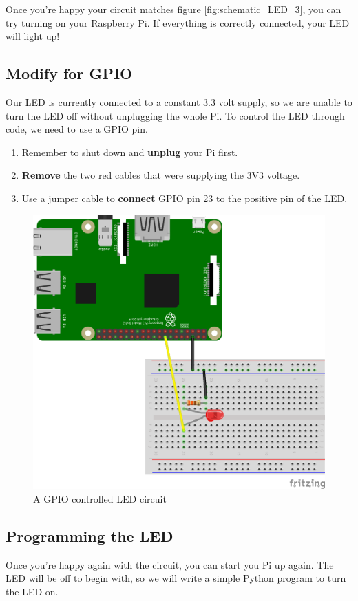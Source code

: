 		Once you're happy your circuit matches figure \ref{fig:schematic_LED_3}, you can try turning on your Raspberry Pi. If everything is correctly connected, your LED will light up!
		
	\subsection{Modify for GPIO}
	
			Our LED is currently connected to a constant 3.3 volt supply, so we are unable to turn the LED off without unplugging the whole Pi. To control the LED through code, we need to use a GPIO pin.
	
			\begin{enumerate}[nosep]
				\item Remember to shut down and \textbf{unplug} your Pi first.
				\item \textbf{Remove} the two red cables that were supplying the 3V3 voltage.
				\item Use a jumper cable to \textbf{connect} GPIO pin 23 to the positive pin of the LED.
			\end{enumerate}	
		
			\begin{figure}[h]
				\centering
				\includegraphics[width=0.6\linewidth]{img/schematic_LED_4}
				\caption{A GPIO controlled LED circuit}
				\label{fig:schematic_LED_4}
			\end{figure}
		
	\subsection{Programming the LED}
		
			Once you're happy again with the circuit, you can start you Pi up again.
			The LED will be off to begin with, so we will write a simple Python program to turn the LED on.
			
